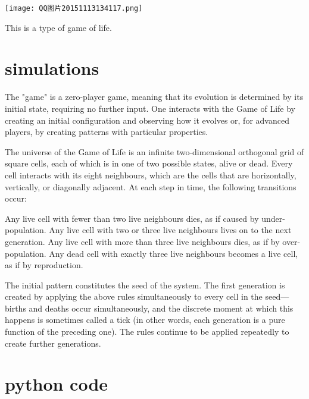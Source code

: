 \begin{marginfigure}%
	\texttt{[image: QQ图片20151113134117.png]}
	\caption{This is a type of game of life.}
	\label{fig:marginfig}
\end{marginfigure}


\vspace{1cm}
\section{simulations}

The "game" is a zero-player game, meaning that its evolution is determined by its initial state, requiring no further input. One interacts with the Game of Life by creating an initial configuration and observing how it evolves or, for advanced players, by creating patterns with particular properties.



	
The universe of the Game of Life is an infinite two-dimensional orthogonal grid of square cells, each of which is in one of two possible states, alive or dead. Every cell interacts with its eight neighbours, which are the cells that are horizontally, vertically, or diagonally adjacent. At each step in time, the following transitions occur:

Any live cell with fewer than two live neighbours dies, as if caused by under-population.
Any live cell with two or three live neighbours lives on to the next generation.
Any live cell with more than three live neighbours dies, as if by over-population.
Any dead cell with exactly three live neighbours becomes a live cell, as if by reproduction.

The initial pattern constitutes the seed of the system. The first generation is created by applying the above rules simultaneously to every cell in the seed—births and deaths occur simultaneously, and the discrete moment at which this happens is sometimes called a tick (in other words, each generation is a pure function of the preceding one). The rules continue to be applied repeatedly to create further generations.

\vspace{1cm}

\section{python code}




